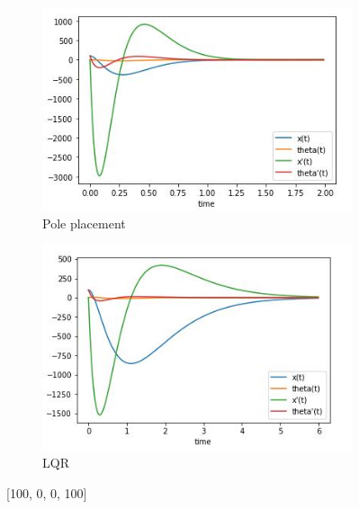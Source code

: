 \documentclass[12pt,letterpaper]{article}
\begin{document}
     \begin{figure}[htb]
        \begin{subfigure}{.5\textwidth}
            \centering
            \includegraphics[width=1\linewidth]{images/output/poles/100-0-0-100.jpg}
            \caption{Pole placement}
            \label{fig:pole_4}
        \end{subfigure}
        \begin{subfigure}{.5\textwidth}
          \centering
          \includegraphics[width=1\linewidth]{images/output/100-0-0-100.jpg}
          \caption{LQR}
        \label{fig:lqr_4}
        \end{subfigure}
    \caption{[100, 0, 0, 100]}
    \end{figure}
    
\end{document}
